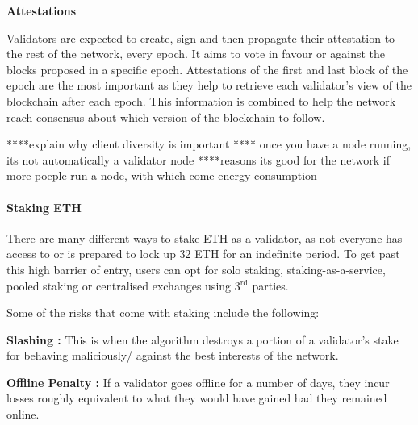 

\textbf{Attestations}

Validators are expected to create, sign and then propagate their attestation to the rest of the network, every epoch. It aims to vote in favour or against the blocks proposed in a specific epoch. Attestations of the first and last block of the epoch are the most important as they help to retrieve each validator's view of the blockchain after each epoch. This information is combined to help the network reach consensus about which version of the blockchain to follow.

 ****explain why client diversity is important
 **** once you have a node running, its not automatically a validator node
****reasons its good for the network if more poeple run a node, with which come energy consumption
 
\paragraph{Staking ETH}

There are many different ways to stake ETH as a validator, as not everyone has access to or is prepared to lock up 32 ETH for an indefinite period. To get past this high barrier of entry, users can opt for solo staking, staking-as-a-service, pooled staking or centralised exchanges using 3$\mathrm{^{rd}}$ parties. 

Some of the risks that come with staking include the following:
 
\textbf{Slashing :}
This is when the algorithm destroys a portion of a validator's stake for behaving maliciously/ against the best interests of the network.

\textbf{Offline Penalty :}
If a validator goes offline for a number of days, they incur losses roughly equivalent to what they would have gained had they remained online. 

